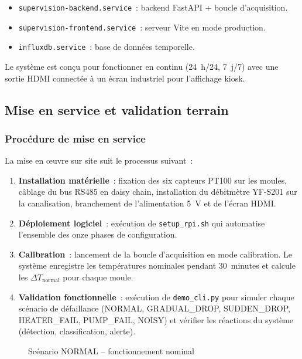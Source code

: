 \begin{itemize}
  \item \texttt{supervision-backend.service}~: backend FastAPI + boucle d'acquisition.
  \item \texttt{supervision-frontend.service}~: serveur Vite en mode production.
  \item \texttt{influxdb.service}~: base de données temporelle.
\end{itemize}

Le système est conçu pour fonctionner en continu (24~h/24, 7~j/7) avec une sortie HDMI connectée à un écran industriel pour l'affichage kiosk.

\subsection{Mise en service et validation terrain}

\subsubsection{Procédure de mise en service}

La mise en œuvre sur site suit le processus suivant~:

\begin{enumerate}
  \item \textbf{Installation matérielle}~: fixation des six capteurs PT100 sur les moules, câblage du bus RS485 en daisy chain, installation du débitmètre YF-S201 sur la canalisation, branchement de l'alimentation 5~V et de l'écran HDMI.
  \item \textbf{Déploiement logiciel}~: exécution de \texttt{setup\_rpi.sh} qui automatise l'ensemble des onze phases de configuration.
  \item \textbf{Calibration}~: lancement de la boucle d'acquisition en mode calibration. Le système enregistre les températures nominales pendant 30~minutes et calcule les \(\Delta T_{\text{normal}}\) pour chaque moule.
  \item \textbf{Validation fonctionnelle}~: exécution de \texttt{demo\_cli.py} pour simuler chaque scénario de défaillance (NORMAL, GRADUAL\_DROP, SUDDEN\_DROP, HEATER\_FAIL, PUMP\_FAIL, NOISY) et vérifier les réactions du système (détection, classification, alerte).
\end{enumerate}

\begin{figure}[htbp]
  \centering
  \caption{Scénario NORMAL -- fonctionnement nominal}
  \label{fig:demo_normal}
\end{figure}

